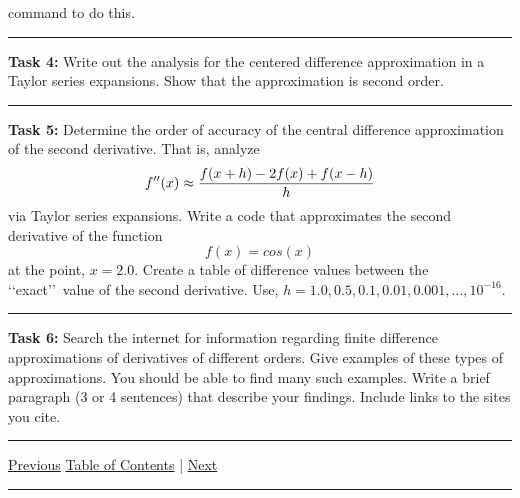 \documentclass[10pt,fleqn]{article}
\begin{document}
\begin{trivlist}
\begin{verbatim}
        \end{verbatim}
        command to do this.
\vskip0.1in\hrule\vskip0.1in \noindent
  \item[\bf Task 4:] Write out the analysis for the centered difference
        approximation in a Taylor series expansions. Show that the approximation
        is second order.
\vskip0.1in\hrule\vskip0.1in \noindent
  \item[\bf Task 5:] Determine the order of accuracy of the central difference
        approximation of the second derivative. That is, analyze
        \[
          f''(x) \approx {{f(x+h) - 2 f(x) + f(x-h)}\over{h}}
        \]
        via Taylor series expansions. Write a code that approximates the second
        derivative of the function
        \[
          f(x) = cos(x)
        \] 
        at the point, \(x=2.0\). Create a table of difference values between the
        \lq\lq exact\rq\rq\ value of the second derivative. Use,
        \(h=1.0,0.5,0.1,0.01,0.001,\ldots,10^{-16}\). 
\vskip0.1in\hrule\vskip0.1in \noindent
  \item[\bf Task 6:] Search the internet for information regarding finite
        difference approximations of derivatives of different orders. Give
        examples of these types of approximations. You should be able to find
        many such examples. Write a brief paragraph (3 or 4 sentences) that
        describe your findings. Include links to the sites you cite.
\end{trivlist}
\vskip0.1in\hrule\vskip0.1in \noindent
  \href{../../tasksheet_01/html/tasksheet_01.html}{Previous}
  \href{../../toc/md/tasksheet_toc.md}{Table of Contents} |
  \href{../../tasksheet_03/html/tasksheet_03.html}{Next}
\vskip0.1in\hrule\vskip0.1in \noindent
\end{document}
